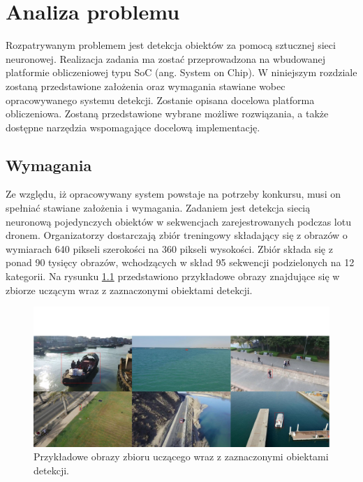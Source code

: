 \chapter{Analiza problemu}
\label{cha:Analiza probemu}

Rozpatrywanym problemem jest detekcja obiektów za pomocą sztucznej sieci neuronowej.
Realizacja zadania ma zostać przeprowadzona na wbudowanej platformie obliczeniowej typu SoC (ang. System on Chip).
W niniejszym rozdziale zostaną przedstawione założenia oraz wymagania stawiane wobec opracowywanego systemu detekcji.
Zostanie opisana docelowa platforma obliczeniowa. Zostaną przedstawione wybrane możliwe rozwiązania, 
a także dostępne narzędzia wspomagające docelową implementację.



\section{Wymagania}
Ze względu, iż opracowywany system powstaje na potrzeby konkursu, 
musi on spełniać stawiane założenia i wymagania.
Zadaniem jest detekcja siecią neuronową pojedynczych obiektów w sekwencjach zarejestrowanych podczas lotu dronem.
Organizatorzy dostarczają zbiór treningowy składający się z obrazów o wymiarach 640 pikseli szerokości na 360 pikseli wysokości. Zbiór składa się z ponad 90 tysięcy obrazów, wchodzących w skład 95 sekwencji podzielonych na 12 kategorii. Na rysunku \ref{fig:sample_images} przedstawiono przykładowe obrazy znajdujące się w zbiorze uczącym wraz z zaznaczonymi obiektami detekcji. 

\begin{figure}
    \centering
    \includegraphics[width=\linewidth]{images/sample_images.png}
    \caption{Przykładowe obrazy zbioru uczącego wraz z zaznaczonymi obiektami detekcji.}
    \label{fig:sample_images}
\end{figure}

